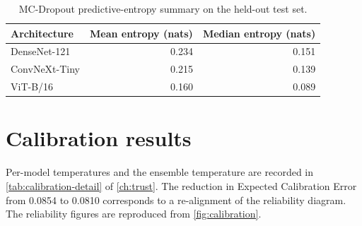\documentclass[../preamble.tex]{subfiles}
\begin{document}
\begin{table}[htbp]
  \centering
  \small
  \caption{MC-Dropout predictive-entropy summary on the held-out test set.}
  \label{tab:mc-entropy}
  \begin{tabular}{lrr}
    \toprule
    \textbf{Architecture} & \textbf{Mean entropy (nats)} & \textbf{Median entropy (nats)} \\
    \midrule
    DenseNet-121   & 0.234 & 0.151 \\
    ConvNeXt-Tiny  & 0.215 & 0.139 \\
    ViT-B/16       & 0.160 & 0.089 \\
    \bottomrule
  \end{tabular}
\end{table}

\section{Calibration results}
\label{sec:results-calib}

Per-model temperatures and the ensemble temperature are recorded in
\cref{tab:calibration-detail} of \cref{ch:trust}. The reduction in
Expected Calibration Error from 0.0854 to 0.0810 corresponds to a
re-alignment of the reliability diagram. The reliability figures are
reproduced from \cref{fig:calibration}.
\end{document}
